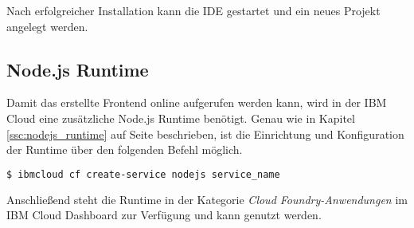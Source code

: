 Nach erfolgreicher Installation kann die IDE gestartet und ein neues Projekt angelegt werden.

\subsection{Node.js Runtime}
Damit das erstellte Frontend online aufgerufen werden kann, wird in der IBM Cloud eine zusätzliche Node.js Runtime
benötigt. Genau wie in Kapitel \ref{ssc:nodejs_runtime} auf Seite \pageref{ssc:nodejs_runtime} beschrieben, ist die
Einrichtung und Konfiguration der Runtime über den folgenden Befehl möglich.

\begin{lstlisting}[language=bash, caption=Instanziierung der Node.js Runtime, label=ls:vorbereitung_nodejsdashboard]
$ ibmcloud cf create-service nodejs service_name
\end{lstlisting}

Anschließend steht die Runtime in der Kategorie \textit{Cloud Foundry-Anwendungen} im IBM Cloud Dashboard zur Verfügung
und kann genutzt werden.